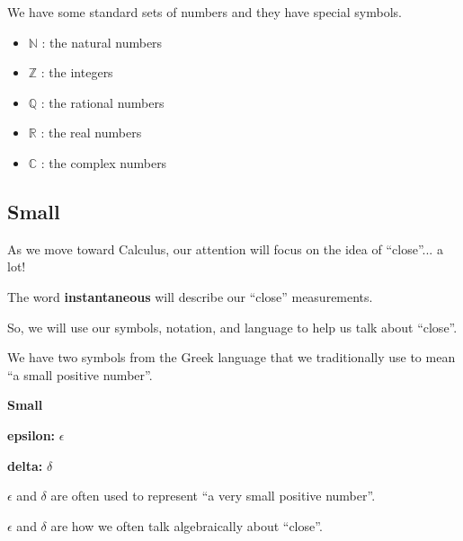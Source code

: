 \documentclass{ximera}
\begin{document}
We have some standard sets of numbers and they have special symbols. 



\begin{itemize}

\item $\mathbb{N}$ : the natural numbers
\item $\mathbb{Z}$ : the integers
\item $\mathbb{Q}$ : the rational numbers
\item $\mathbb{R}$ : the real numbers
\item $\mathbb{C}$ : the complex numbers
\end{itemize}

















\subsection*{Small}



As we move toward Calculus, our attention will focus on the idea of  ``close''... a lot! 


The word \textbf{instantaneous} will describe our ``close'' measurements. 


So, we will use our symbols, notation, and language to help us talk about ``close''. 


We have two symbols from the Greek language that we traditionally use to mean ``a small positive number''. 



\begin{notation} \textbf{\textcolor{red!50!green}{Small}} 


\textbf{\textcolor{red!50!green}{epsilon:}}  $\epsilon$ 

\textbf{\textcolor{red!50!green}{delta:}}  $\delta$ 


\end{notation}

$\epsilon$ and $\delta$ are often used to represent ``a very small positive number''.   


$\epsilon$ and $\delta$ are how we often talk algebraically about ``close''. 
\end{document}
